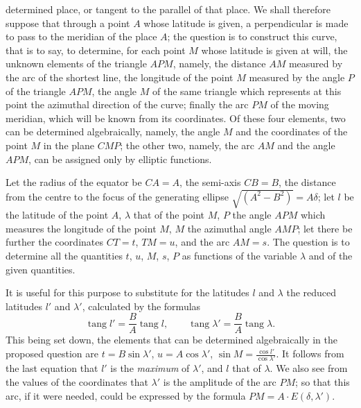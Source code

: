 \documentclass{article}
\begin{document}
determined place, or tangent to the parallel of that place. We shall therefore suppose that through a point $A$ whose latitude is given, a perpendicular is made to pass to the meridian of the place $A$; the question is to construct this curve, that is to say, to determine, for each point $M$ whose latitude is given at will, the unknown elements of the triangle $APM$, namely, the distance $AM$ measured by the arc of the shortest line, the longitude of the point $M$ measured by the angle $P$ of the triangle $APM$, the angle $M$ of the same triangle which represents at this point the azimuthal direction of the curve; finally the arc $PM$ of the moving meridian, which will be known from its coordinates. Of these four elements, two can be determined algebraically, namely, the angle $M$ and the coordinates of the point $M$ in the plane $CMP$; the other two, namely, the arc $AM$ and the angle $APM$, can be assigned only by elliptic functions.


Let the radius of the equator be $CA=A$, the semi-axis $CB=B$, the distance from the centre to the focus of the generating ellipse $\sqrt{(A^{2}-B^{2})}=A\delta$; let $l$ be the latitude of the point $A$, $\lambda$ that of the point $M$, $P$ the angle $APM$ which measures the longitude of the point $M$, $M$ the azimuthal angle $AMP$; let there be further the coordinates $CT=t$, $TM=u$, and the arc $AM=s$. The question is to determine all the quantities $t$, $u$, $M$, $s$, $P$ as functions of the variable $\lambda$ and of the given quantities.

It is useful for this purpose to substitute for the latitudes $l$ and $\lambda$ the reduced latitudes $l'$ and $\lambda'$, calculated by the formulas
\[ \operatorname{tang} l'=\frac{B}{A}\operatorname{tang} l,\qquad \operatorname{tang}\lambda'=\frac{B}{A}\operatorname{tang}\lambda. \]
This being set down, the elements that can be determined algebraically in the proposed question are $t=B\sin\lambda'$, $u=A\cos\lambda'$, $\sin M=\frac{\cos l'}{\cos\lambda'}$. It follows from the last equation that $l'$ is the \emph{maximum} of $\lambda'$, and $l$ that of $\lambda$. We also see from the values of the coordinates that $\lambda'$ is the amplitude of the arc $PM$; so that this arc, if it were needed, could be expressed by the formula $PM=A\cdot E(\delta,\lambda')$.
\end{document}
